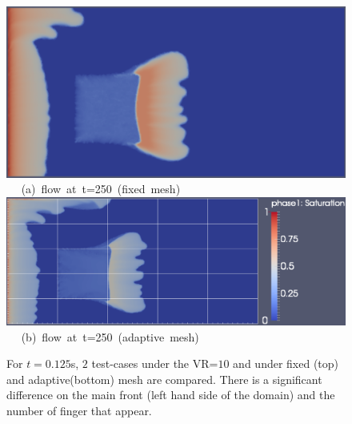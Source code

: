 \begin{landscape}
\begin{figure}[ht] 
\vbox{
\hbox{\hspace{3.5cm}
\includegraphics[width=.65\textwidth]{./Pics1/mr10_5regions_fixed/5regions_fixed_250.pdf} 
}
\vspace{0.0cm}
\hbox{\hspace{6.5cm} (a) flow at t=250 (fixed mesh)  
}
\vspace{0.25cm}
\hbox{\hspace{3.5cm}
\includegraphics[width=.9\textwidth]{./Pics1/mr10_5regions_adapt/5regions_adapt_250_1.pdf}
}
\vspace{0.0cm}
\hbox{\hspace{6.5cm} (b) flow at t=250 (adaptive mesh)    
}
}     
\caption{For $t=0.125$s, $2$ test-cases under the VR=$10$ and under fixed (top) and adaptive(bottom) mesh are compared. There is a significant difference on the main front (left hand side of the domain) and the number of finger that appear.}
\label{fig:2testcase_a}
\end{figure}
\end{landscape}
\clearpage


